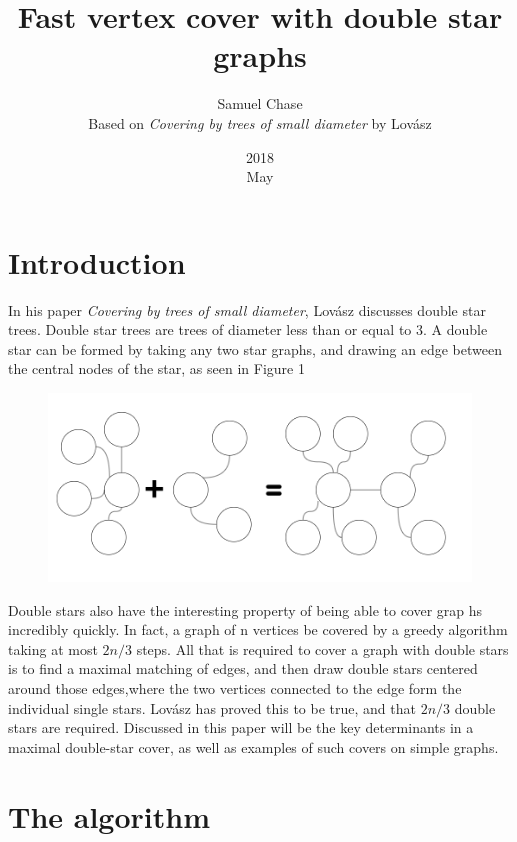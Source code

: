 \documentclass{article}
\title{Fast vertex cover with double star graphs}
\date{2018\\ May}
\author{Samuel Chase\\ Based on \textit{Covering by trees of small diameter} by Lov\'asz}
\begin{document}
	\maketitle
	\section{Introduction}
	In his paper \textit{Covering by trees of small diameter}, Lov\'asz discusses double star trees. Double star trees are trees of diameter less than or equal to 3. A double star can be formed by taking any two star graphs, and drawing an edge between the central nodes of the star, as seen in Figure 1
	\begin{figure}[h]
		\caption{}
		\includegraphics{Figure1}
	\end{figure}
	
	Double stars also have the interesting property of being able to cover grap hs incredibly quickly. In fact, a graph of n vertices be covered by a greedy algorithm taking at most $2n/3$ steps. All that is required to cover a graph with double stars is to find a maximal matching of edges, and then draw double stars centered around those edges,where the two vertices connected to the edge form the individual single stars. Lov\'asz has proved this to be true, and that $2n/3$ double stars are required. Discussed in this paper will be the key determinants in a maximal double-star cover, as well as examples of such covers on simple graphs.
	\section{The algorithm}
	
\end{document}

